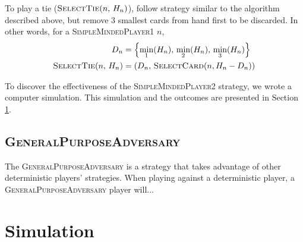 \documentclass[conference]{IEEEtran}
\newcommand\SMPo{\textsc{SimpleMindedPlayer1}}
\newcommand\SMPt{\textsc{SimpleMindedPlayer2}}
\newcommand\GPA{\textsc{GeneralPurposeAdversary}}
\begin{document}
To play a tie ($\textsc{SelectTie}(n,\,H_n)$), follow strategy similar to the
algorithm described above, but remove 3 smallest cards from hand first to be
discarded. In other words, for a \SMPo{} $n$,
\begin{align*}
     D_n &= \left\{\min_1(H_n),\,\min_2(H_n),\,\min_3(H_n)\right\} \\
     \textsc{SelectTie}(n,\,H_n) &= \left(D_n,\,\textsc{SelectCard}(n, H_n - D_n)\right)
\end{align*}

To discover the effectiveness of the \SMPt{} strategy, we wrote a computer
simulation. This simulation and the outcomes are presented in Section
\ref{sec:sim}.

\subsection{\GPA}
The \GPA{} is a strategy that takes advantage of other deterministic players'
strategies. When playing against a deterministic player, a \GPA{} player
will...

\section{Simulation}
\label{sec:sim}

\begin{figure}
    \begin{center}
    \end{center}
\end{figure}

\begin{figure}
    \begin{center}
    \end{center}
\end{figure}
\end{document}
